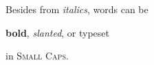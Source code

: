 \documentclass{article}
\begin{document}
Besides from {\itshape italics}, words can be

{\bfseries bold}, {\slshape slanted}, or typeset

in {\scshape Small Caps}.
\end{document}
